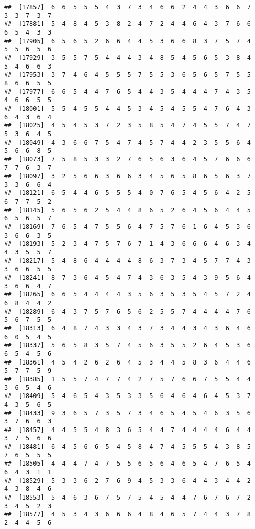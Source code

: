 \documentclass[
]{book}
\begin{document}
\begin{verbatim}
##  [17857]  6  6  5  5  5  4  3  7  3  4  6  6  2  4  4  3  6  6  7  3  3  7  3  7
##  [17881]  5  4  8  4  5  3  8  2  4  7  2  4  4  6  4  3  7  6  6  6  5  4  3  3
##  [17905]  6  5  6  5  2  6  6  4  4  5  3  6  6  8  3  7  5  7  4  5  5  6  5  6
##  [17929]  3  5  5  7  5  4  4  4  3  4  8  5  4  5  6  5  3  8  4  5  4  6  6  3
##  [17953]  3  7  4  6  4  5  5  5  7  5  5  3  6  5  6  5  7  5  5  8  6  6  5  5
##  [17977]  6  6  5  4  4  7  6  5  4  4  3  5  4  4  4  7  4  3  5  4  6  6  5  5
##  [18001]  5  5  4  5  5  4  4  5  3  4  5  4  5  5  4  7  6  4  3  6  4  3  6  4
##  [18025]  4  5  4  5  3  7  2  3  5  8  5  4  7  4  5  5  7  4  7  5  3  6  4  5
##  [18049]  4  3  6  6  7  5  4  7  4  5  7  4  4  2  3  5  5  6  4  5  6  6  8  5
##  [18073]  7  5  8  5  3  3  2  7  6  5  6  3  6  4  5  7  6  6  6  7  7  6  3  7
##  [18097]  3  2  5  6  6  3  6  6  3  4  5  6  5  8  6  5  6  3  7  3  3  6  6  4
##  [18121]  6  5  4  4  6  5  5  5  4  0  7  6  5  4  5  6  4  2  5  6  7  7  5  2
##  [18145]  5  6  5  6  2  5  4  4  8  6  5  2  6  4  5  6  4  4  5  6  5  6  5  7
##  [18169]  7  6  5  4  7  5  5  6  4  7  5  7  6  1  6  4  5  3  6  3  6  6  3  5
##  [18193]  5  2  3  4  7  5  7  6  7  1  4  3  6  6  6  4  6  3  4  4  3  5  5  7
##  [18217]  5  4  8  6  4  4  4  4  8  6  3  7  3  4  5  7  7  4  3  3  6  6  5  5
##  [18241]  8  7  3  6  4  5  4  7  4  3  6  3  5  4  3  9  5  6  4  3  6  6  4  7
##  [18265]  6  6  5  4  4  4  4  3  5  6  3  5  3  5  4  5  7  2  4  6  8  4  4  2
##  [18289]  6  4  3  7  5  7  6  5  6  2  5  5  7  4  4  4  4  7  6  5  6  7  5  5
##  [18313]  6  4  8  7  4  3  3  4  3  7  3  4  4  3  4  3  6  4  6  6  0  5  4  5
##  [18337]  5  6  5  8  3  5  7  4  5  6  3  5  5  2  6  4  5  3  6  6  5  4  5  6
##  [18361]  4  5  4  2  6  2  6  4  5  3  4  4  5  8  3  6  4  4  6  5  7  7  5  9
##  [18385]  1  5  5  7  4  7  7  4  2  7  5  7  6  6  7  5  5  4  4  3  6  5  4  6
##  [18409]  5  4  6  5  4  3  5  3  3  5  6  4  6  4  6  4  5  3  7  4  3  5  6  5
##  [18433]  9  3  6  5  7  3  5  7  3  4  6  5  4  5  4  6  3  5  6  3  7  6  6  3
##  [18457]  4  4  5  5  4  8  3  6  5  4  4  7  4  4  4  4  6  4  4  3  7  5  6  6
##  [18481]  6  4  5  6  6  5  4  5  8  4  7  4  5  5  5  4  3  8  5  7  6  5  5  5
##  [18505]  4  4  4  7  4  7  5  5  6  5  6  4  6  5  4  7  6  5  4  6  4  3  1  1
##  [18529]  5  3  3  6  2  7  6  9  4  5  3  3  6  4  4  3  4  4  2  4  3  8  4  6
##  [18553]  5  4  6  3  6  7  5  7  5  4  5  4  4  7  6  7  6  7  2  3  4  5  2  3
##  [18577]  4  5  3  4  3  6  6  6  4  8  4  6  5  7  4  4  3  7  8  2  4  4  5  6

\end{verbatim}
\end{document}
